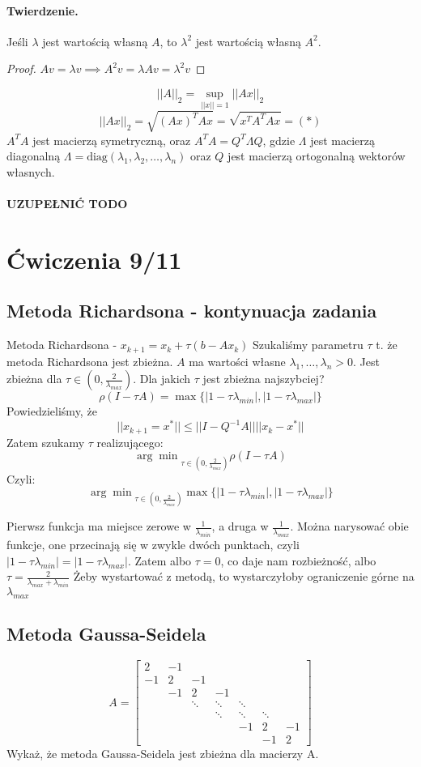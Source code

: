 \documentclass{article}
\begin{document}
\paragraph{Twierdzenie.} Jeśli $ \lambda $ jest wartością własną $ A $, to $ \lambda^2 $ jest wartością własną $ A^2 $.\begin{proof}
	$Av=\lambda v \implies A^2v=\lambda Av=\lambda^2v$
\end{proof}
$$ ||A||_2=\sup_{||x||=1}||Ax||_2 $$
$$||Ax||_2=\sqrt{(Ax)^TAx}=\sqrt{x^TA^TAx}=(*)$$
$ A^TA $ jest macierzą symetryczną, oraz $ A^TA=Q^T\Lambda Q $, gdzie $ \Lambda $ jest macierzą diagonalną $ \Lambda=\text{diag}(\lambda_1, \lambda_2, \ldots, \lambda_n) $ oraz $ Q $ jest macierzą ortogonalną wektorów własnych.

\paragraph{UZUPEŁNIĆ TODO}
\section{Ćwiczenia 9/11}
\subsection{Metoda Richardsona - kontynuacja zadania}
Metoda Richardsona - $ x_{k+1}=x_k+\tau(b-Ax_k) $
Szukaliśmy parametru $ \tau $ t. że metoda Richardsona jest zbieżna.
$ A $ ma wartości własne $ \lambda_1, \ldots, \lambda_n>0 $.
Jest zbieżna dla $ \tau\in(0, \frac2{\lambda_{max}}) $. Dla jakich $ \tau $ jest zbieżna najszybciej?
$$\rho(I-\tau A)=\max\{|1-\tau\lambda_{min}|, |1-\tau\lambda_{max}|\}$$
Powiedzieliśmy, że
$$ ||x_{k+1}=x^*||\le||I-Q^{-1}A||||x_k-x^*|| $$
Zatem szukamy $ \tau $ realizującego: 
$$ {\arg\min}_{\tau\in(0, \frac2{\lambda_{max}})}\rho(I-\tau A)$$
Czyli: 
$$ {\arg\min}_{\tau\in(0, \frac2{\lambda_{max}})} \max\{|1-\tau\lambda_{min}|, |1-\tau\lambda_{max}|\} $$

Pierwsz funkcja ma miejsce zerowe w $ \frac1{\lambda_{min}} $, a druga w $ \frac1{\lambda_{max}} $. Można narysować obie funkcje, one przecinają się w zwykle dwóch punktach, czyli $ |1-\tau\lambda_{min}| = |1-\tau\lambda_{max}| $. Zatem albo $ \tau = 0 $, co daje nam rozbieżność, albo $ \tau=\frac2{\lambda_{max}+\lambda_{min}} $ Żeby wystartować z metodą, to wystarczyłoby ograniczenie górne na $ \lambda_{max} $
\subsection{Metoda Gaussa-Seidela}
$$A=\begin{bmatrix}
	2&-1&&&&\\
	-1&2&-1&&&&\\
	&-1&2&-1&&&\\
	&&\ddots&\ddots&\ddots&&\\
	&&&\ddots&\ddots&\ddots&\\
	&&&&-1&2&-1\\
	&&&&&-1&2
\end{bmatrix}$$
Wykaż, że metoda Gaussa-Seidela jest zbieżna dla macierzy A.
\end{document}
